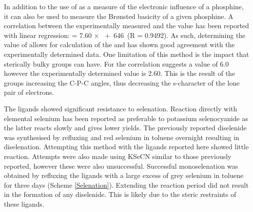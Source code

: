 
%

In addition to the use of \JPSe{} as a measure of the electronic influence of a phosphine, it can also be used to measure the Br\o{}nsted basicity of a given phosphine.  A correlation between the experimentally measured \pKb{} and the \JPSe{} value has been reported with linear regression: \JPSe{} = 7.60 $\times{}$ \pKb{}~+~646~(R = 0.9492).\cite{Beckmann2011}  As such, determining the value of \JPSe{} allows for calculation of the \pKb{} and has shown good agreement with the experimentally determined data.  One limitation of this method is the impact that sterically bulky groups can have.  For  the correlation suggests a \pKb{} value of 6.0 however the experimentally determined value is 2.60.\cite{Beckmann2011}  This is the result of the \tBu{} groups increasing the C-P-C angles, thus decreasing the s-character of the lone pair of electrons.

The \tBuxantphos{} ligands showed significant resistance to selenation.  Reaction directly with elemental selenium has been reported as preferable to potassium selenocyanide as the latter reacts slowly and gives lower yields.\cite{Beckmann2011}  The previously reported \Phxantphos{} diselenide was synthesised by refluxing \Phxantphos{} and red selenium in toluene overnight resulting in diselenation.\cite{Jahromi2012}  Attempting this method with the \tBuxantphos{} ligands reported here showed little reaction.  Attempts were also made using KSeCN similar to those previously reported, \cite{Bungu2007} however these were also unsuccessful.  Successful monoselenation was obtained by refluxing the ligands with a large excess of grey selenium in toluene for three days (Scheme \ref{Selenation}).  Extending the reaction period did not result in the formation of any diselenide.  This is likely due to the steric restraints of these ligands.

